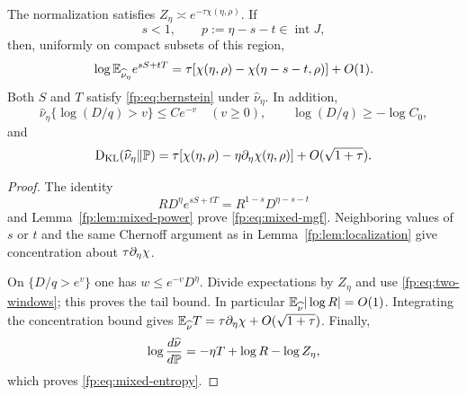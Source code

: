 \begin{theorem}\label{fp:thm:mixed}
The normalization satisfies $Z_\eta\asymp e^{-\tau\chi(\eta,\rho)}$. If
\begin{equation}\label{fp:eq:signed-domain}
 s<1,\qquad p:=\eta-s-t\in\operatorname{int}J,
\end{equation}
then, uniformly on compact subsets of this region,
\begin{equation}\label{fp:eq:mixed-mgf}
 \log\mathbb E_{\widehat\nu_\eta}e^{sS+tT}
 =\tau[\chi(\eta,\rho)-\chi(\eta-s-t,\rho)]+O(1).
\end{equation}
Both $S$ and $T$ satisfy \eqref{fp:eq:bernstein} under $\widehat\nu_\eta$. In addition,
\begin{equation}\label{fp:eq:ratio-tail}
 \widehat\nu_\eta\{\log(D/q)>v\}\le Ce^{-v}\quad(v\ge0),
 \qquad \log(D/q)\ge-\log C_0,
\end{equation}
and
\begin{equation}\label{fp:eq:mixed-entropy}
 \operatorname{D_{\mathrm{KL}}}(\widehat\nu_\eta\Vert\mathbb P)
 =\tau[\chi(\eta,\rho)-\eta\partial_\eta\chi(\eta,\rho)]
 +O(\sqrt{1+\tau}).
\end{equation}
\end{theorem}
\begin{proof}
The identity
\[
 RD^\eta e^{sS+tT}=R^{1-s}D^{\eta-s-t}
\]
and Lemma~\ref{fp:lem:mixed-power} prove \eqref{fp:eq:mixed-mgf}. Neighboring values of $s$ or $t$ and the same Chernoff argument as in Lemma~\ref{fp:lem:localization} give concentration about $\tau\partial_\eta\chi$.

On $\{D/q>e^v\}$ one has $w\le e^{-v}D^\eta$. Divide expectations by $Z_\eta$ and use \eqref{fp:eq:two-windows}; this proves the tail bound. In particular $\mathbb E_{\widehat\nu}|\log R|=O(1)$. Integrating the concentration bound gives $\mathbb E_{\widehat\nu}T=\tau\partial_\eta\chi+O(\sqrt{1+\tau})$. Finally,
\[
 \log\frac{d\widehat\nu}{d\mathbb P}=-\eta T+\log R-\log Z_\eta,
\]
which proves \eqref{fp:eq:mixed-entropy}.
\end{proof}

